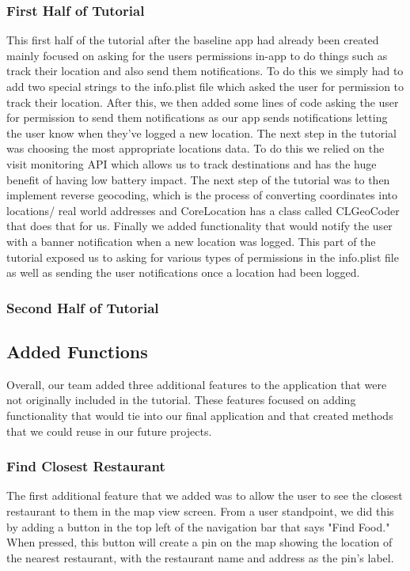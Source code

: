 \documentclass[conference]{IEEEtran}
\begin{document}
\subsubsection{First Half of Tutorial}
This first half of the tutorial after the baseline app had already been created mainly focused on asking for the users permissions in-app to do things such as track their location and also send them notifications. To do this we simply had to add two special strings to the info.plist file which asked the user for permission to track their location. After this, we then added some lines of code asking the user for permission to send them notifications as our app sends notifications letting the user know when they've logged a new location. The next step in the tutorial was choosing the most appropriate locations data. To do this we relied on the visit monitoring API which allows us to track destinations and has the huge benefit of having low battery impact. The next step of the tutorial was to then implement reverse geocoding, which is the process of converting coordinates into locations/ real world addresses and CoreLocation has a class called CLGeoCoder that does that for us. Finally we added functionality that would notify the user with a banner notification when a new location was logged. This part of the tutorial exposed us to asking for various types of permissions in the info.plist file as well as sending the user notifications once a location had been logged.

\subsubsection{Second Half of Tutorial}

\subsection{Added Functions}
Overall, our team added three additional features to the application that were not 
originally included in the tutorial. These features focused on adding functionality
that would tie into our final application and that created methods that we could
reuse in our future projects.

\subsubsection{Find Closest Restaurant}
The first additional feature that we added was to allow the user to see the closest
restaurant to them in the map view screen. From a user standpoint, we did this by 
adding a button in the top left of the navigation bar that says "Find Food." When 
pressed, this button will create a pin on the map showing the location of the nearest
restaurant, with the restaurant name and address as the pin's label.
\end{document}
